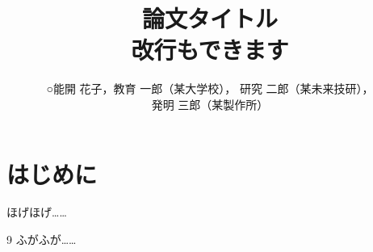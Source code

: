 \documentclass[lualatex,fleqn]{uitex}
\title{論文タイトル\\改行もできます}
\author{%
  ○能開 花子，教育 一郎（某大学校），%
  研究 二郎（某未来技研），\\%
  発明 三郎（某製作所）}
\begin{document}
\maketitle

\section{はじめに}

ほげほげ……

\begin{thebibliography}{9}
    ふがふが……
\end{thebibliography}
\end{document}

